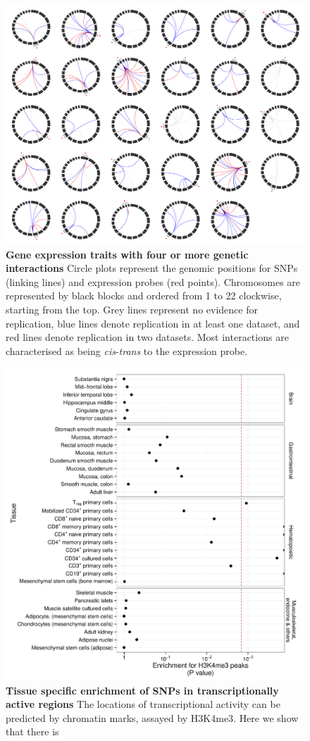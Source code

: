 \documentclass{article}
\begin{document}
\begin{figure}
	\includegraphics[width=5in]{circles_replication2}
	\caption{\textbf{Gene expression traits with four or more genetic interactions} Circle plots represent the genomic positions for SNPs (linking lines) and expression probes (red points). Chromosomes are represented by black blocks and ordered from 1 to 22 clockwise, starting from the top. Grey lines represent no evidence for replication, blue lines denote replication in at least one dataset, and red lines denote replication in two datasets. Most interactions are characterised as being \emph{cis}-\emph{trans} to the expression probe.}
	\label{fig:circleplots}
\end{figure}
\clearpage

\begin{figure}
	\includegraphics[width=5in]{cis_h3k4me3}
	\caption{\textbf{Tissue specific enrichment of SNPs in transcriptionally active regions} The locations of transcriptional activity can be predicted by chromatin marks, assayed by H3K4me3. Here we show that there is }
	\label{fig:cish3k4me3}
\end{figure}
\end{document}
